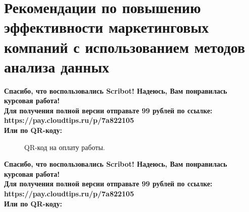 \documentclass{article}
\begin{document}
\newpage

\section{Рекомендации по повышению эффективности маркетинговых компаний с использованием методов анализа данных}
\begin{center}
    \textbf{
        Спасибо, что воспользовались Scribot! Надеюсь, Вам понравилась курсовая работа!\\
        Для получения полной версии отправьте 99 рублей по ссылке:\\
        https://pay.cloudtips.ru/p/7a822105\\
        Или по QR-коду:\\
    }
\end{center}
\begin{figure}[h]
    \caption{QR-код на оплату работы.}
    \label{ris:image}
\end{figure}
\newpage
\begin{center}
    \textbf{
        Спасибо, что воспользовались Scribot! Надеюсь, Вам понравилась курсовая работа!\\
        Для получения полной версии отправьте 99 рублей по ссылке:\\
        https://pay.cloudtips.ru/p/7a822105\\
        Или по QR-коду:\\
    }
\end{center}
\end{document}
